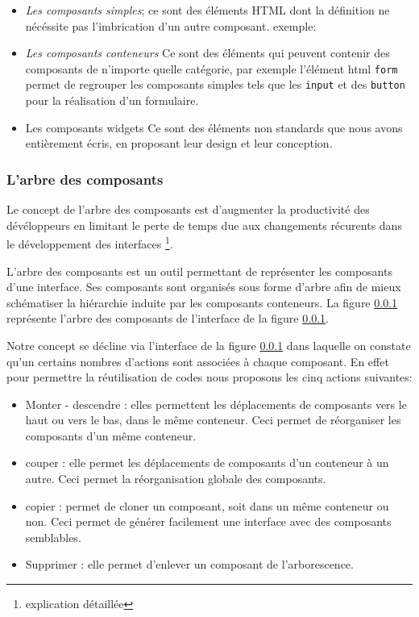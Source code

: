 \documentclass[a4paper,11pt]{report}
\begin{document}
\begin{itemize}
\item {\em Les composants simples};
ce sont des éléments HTML dont la définition ne nécéssite pas
l'imbrication d'un autre composant.
exemple:
\item  {\em Les composants conteneurs} 
Ce sont des éléments qui peuvent contenir des composants de
n'importe quelle catégorie, par exemple l'élément html {\tt form}
permet de regrouper les composants simples tels que les {\tt input} et
des {\tt button} pour la réalisation d'un formulaire.
\item Les composants widgets
Ce sont des éléments non standards que nous avons entièrement écris, en
proposant leur design et leur conception.
\end{itemize}



\subsubsection{ L'arbre des composants} 
Le concept de l'arbre des composants est d'augmenter la productivité
des dévéloppeurs en limitant le perte de temps due aux changements
récurents dans le développement des interfaces \footnote{explication détaillée}.


L'arbre des composants est un outil permettant de représenter les
composants d'une interface. Ses composants sont organisés sous forme
d'arbre afin de mieux schématiser la hiérarchie induite par les
composants conteneurs. La figure \ref{} représente l'arbre des
composants de l'interface de la figure \ref{}.

Notre concept se décline via l'interface de la figure \ref{} dans
laquelle on constate qu'un certains nombres d'actions sont associées à
chaque composant. En effet pour permettre la réutilisation de codes
nous proposons les cinq actions suivantes:

\begin{itemize}
\item Monter - descendre : elles permettent les déplacements de
  composants vers le haut ou vers le bas, dans le même conteneur. Ceci
  permet de réorganiser les composants d'un même conteneur.

\item couper : elle permet les déplacements de composants d'un
  conteneur à un autre. Ceci permet la réorganisation globale des
  composants.
\item copier : permet de cloner
 un composant, soit dans un même
  conteneur ou non. Ceci permet de générer facilement une interface avec
  des composants semblables.
\item Supprimer : elle permet d'enlever un composant de l'arborescence.
\end{itemize}
\end{document}
